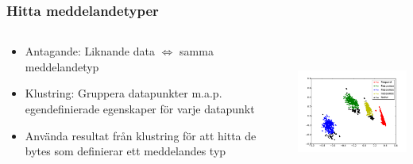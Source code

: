 \documentclass[xetex]{beamer}
\begin{document}
    \begin{frame}
        \frametitle{Hitta meddelandetyper}
        \begin{columns}[t]
            \begin{column}[T]{6cm}
                \begin{itemize}
                    \item Antagande: Liknande data $\Leftrightarrow$ samma meddelandetyp
                    \item Klustring: Gruppera datapunkter m.a.p. egendefinierade egenskaper
                        för varje datapunkt
                    \item Använda resultat från klustring för att hitta de bytes som
                        definierar ett meddelandes typ
                \end{itemize}
            \end{column}
            \begin{column}[T]{6cm}
                \includegraphics[height=4.5cm]{img/dbscan_dns.pdf}
            \end{column}
        \end{columns}
    \end{frame}
\end{document}
